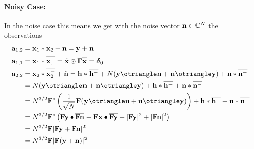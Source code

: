 \documentclass[conference]{IEEEtran}
\begin{document}
\paragraph{Noisy Case:} In the noise case this means we get with the noise vector
${\mathbf n}\in{\ensuremath{\mathbb C}}^{N}$ the observations
%
\begin{align}
  \va_{1,2}&=\vxone *\vxtwo+\vn=\vy+\vn\\
  \va_{1,1}&=\vxone*\cc{\Rvxone}=\vtx\circledast\vGam\cc{\vtx}=\vdel_0\\
  \va_{2,2}&=\vxtwo*\cc{\Rvxtwo}+\vtn=\vh*\cc{\vh^-}+ N (\vy\otriangle\vn + \vn\otriangle\vy)+ \vn*\cc{\vn^-} \\
  &=N (\vy\otriangle\vn + \vn\otriangle\vy) + \vh*\cc{\vh^-} + \vn*\cc{\vn^-}\\
  &=N^{3/2} \Fmatrixa \left(\frac{1}{\sqrt{N}}\Fmatrix(\vy\otriangle\vn + \vn\otriangle\vy)\right) + \vh*\cc{\vh^-} +
  \vn*\cc{\vn^-}\\
  &=N^{3/2} \Fmatrixa \left(\Fmatrix\vy\bullet\cc{\Fmatrix\vn} +\Fmatrix\vx\bullet\cc{\Fmatrix\vy} + |\Fmatrix
  \vy|^2+|\Fmatrix\vn|^2\right)\\
  &=N^{3/2}\Fmatrix|\Fmatrix \vy + \Fmatrix\vn|^2\\
  &=N^{3/2}\Fmatrix|\Fmatrix (\vy+\vn)|^2
\end{align}

\color{black} %
\fi







\end{document}
